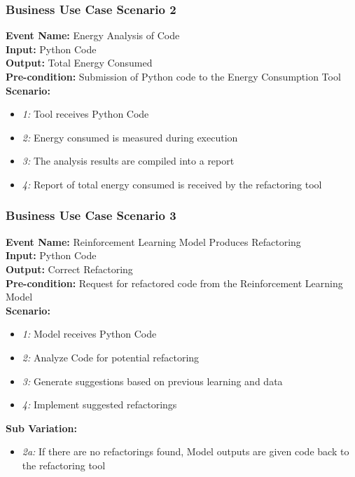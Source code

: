 \documentclass[12pt]{article}
\begin{document}
\subsubsection{Business Use Case Scenario 2} 
\textbf{Event Name:} Energy Analysis of Code \\
\textbf{Input:} Python Code \\
\textbf{Output:} Total Energy Consumed \\
\textbf{Pre-condition:} Submission of Python code to the Energy Consumption Tool \\
\textbf{Scenario: } 
\begin{itemize}
    \item \textit{1:} Tool receives Python Code
    \item \textit{2:} Energy consumed is measured during execution
    \item \textit{3:} The analysis results are compiled into a report
    \item \textit{4:} Report of total energy consumed is received by the refactoring tool
\end{itemize}

\subsubsection{Business Use Case Scenario 3} 
\textbf{Event Name:} Reinforcement Learning Model Produces Refactoring \\
\textbf{Input:} Python Code \\
\textbf{Output:} Correct Refactoring \\
\textbf{Pre-condition:} Request for refactored code from the Reinforcement Learning Model \\
\textbf{Scenario: } 
\begin{itemize}
    \item \textit{1:} Model receives Python Code
    \item \textit{2:} Analyze Code for potential refactoring
    \item \textit{3:} Generate suggestions based on previous learning and data
    \item \textit{4:} Implement suggested refactorings
\end{itemize}
\textbf{Sub Variation: }
\begin{itemize}
    \item \textit{2a:} If there are no refactorings found, Model outputs are given code back to the refactoring tool 
\end{itemize}
\end{document}
